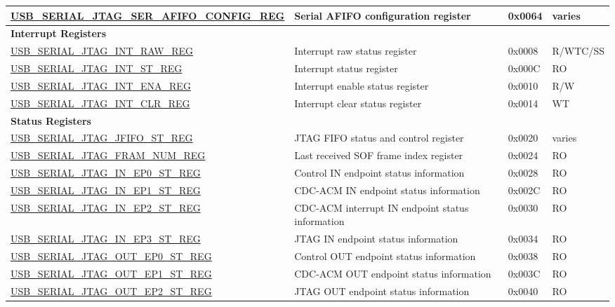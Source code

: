 \begin{longtable}{ | p{7.3cm} | p{5.7cm} | p{1.2cm} | p{1.5cm} | }
\hyperref[regdesc:USBSERIALJTAGSERAFIFOCONFIGREG]{USB\_SERIAL\_JTAG\_SER\_AFIFO\_CONFIG\_REG} & Serial AFIFO configuration register & 0x0064 & varies \\ \hline
\multicolumn{4}{|l|}{\textbf{Interrupt Registers}} \\ \hline
\hyperref[regdesc:USBSERIALJTAGINTRAWREG]{USB\_SERIAL\_JTAG\_INT\_RAW\_REG} & Interrupt raw status register & 0x0008 & R/WTC/SS \\ \hline
\hyperref[regdesc:USBSERIALJTAGINTSTREG]{USB\_SERIAL\_JTAG\_INT\_ST\_REG} & Interrupt status register & 0x000C & RO \\ \hline
\hyperref[regdesc:USBSERIALJTAGINTENAREG]{USB\_SERIAL\_JTAG\_INT\_ENA\_REG} & Interrupt enable status register & 0x0010 & R/W \\ \hline
\hyperref[regdesc:USBSERIALJTAGINTCLRREG]{USB\_SERIAL\_JTAG\_INT\_CLR\_REG} & Interrupt clear status register & 0x0014 & WT \\ \hline
\multicolumn{4}{|l|}{\textbf{Status Registers}} \\ \hline
\hyperref[regdesc:USBSERIALJTAGJFIFOSTREG]{USB\_SERIAL\_JTAG\_JFIFO\_ST\_REG} & JTAG FIFO status and control register & 0x0020 & varies \\ \hline
\hyperref[regdesc:USBSERIALJTAGFRAMNUMREG]{USB\_SERIAL\_JTAG\_FRAM\_NUM\_REG} & Last received SOF frame index register & 0x0024 & RO \\ \hline
\hyperref[regdesc:USBSERIALJTAGINEP0STREG]{USB\_SERIAL\_JTAG\_IN\_EP0\_ST\_REG} & Control IN endpoint status information & 0x0028 & RO \\ \hline
\hyperref[regdesc:USBSERIALJTAGINEP1STREG]{USB\_SERIAL\_JTAG\_IN\_EP1\_ST\_REG} & CDC-ACM IN endpoint status information & 0x002C & RO \\ \hline
\hyperref[regdesc:USBSERIALJTAGINEP2STREG]{USB\_SERIAL\_JTAG\_IN\_EP2\_ST\_REG} & CDC-ACM interrupt IN endpoint status information & 0x0030 & RO \\ \hline
\hyperref[regdesc:USBSERIALJTAGINEP3STREG]{USB\_SERIAL\_JTAG\_IN\_EP3\_ST\_REG} & JTAG IN endpoint status information & 0x0034 & RO \\ \hline
\hyperref[regdesc:USBSERIALJTAGOUTEP0STREG]{USB\_SERIAL\_JTAG\_OUT\_EP0\_ST\_REG} & Control OUT endpoint status information & 0x0038 & RO \\ \hline
\hyperref[regdesc:USBSERIALJTAGOUTEP1STREG]{USB\_SERIAL\_JTAG\_OUT\_EP1\_ST\_REG} & CDC-ACM OUT endpoint status information & 0x003C & RO \\ \hline
\hyperref[regdesc:USBSERIALJTAGOUTEP2STREG]{USB\_SERIAL\_JTAG\_OUT\_EP2\_ST\_REG} & JTAG OUT endpoint status information & 0x0040 & RO \\ \hline

\end{longtable}
